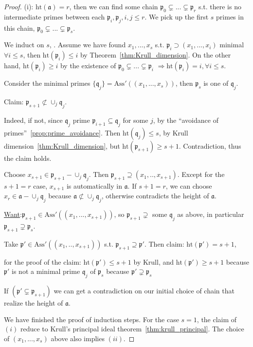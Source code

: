 \documentclass[11pt]{article}
\newcommand{\sca}{{\mathfrak a}}
\newcommand{\scp}{{\mathfrak p}}
\newcommand{\scq}{\mathfrak q}
\newcommand{\Lrta}{\Longrightarrow}
\begin{document}
\begin{proof}
(i): $\text{ht}(\sca)=r$, then we can find some chain $\scp_0\subsetneq ...\subsetneq\scp_r $ s.t. there is no intermediate primes between each $\scp_i,\scp_j,i,j\leq r$. We pick up the first $s$ primes in this chain, $\scp_0\subsetneq ...\subsetneq\scp_s$. 

We induct on $s$, . Assume we have found $x_1,...,x_s$ s.t.
$\scp_i\supset(x_1,...,x_i)$ minimal $\forall i\leq s$, then $\text{ht}(\scp_i)\leq i$ by Theorem~\ref{thm:Krull_dimension}. On the other hand, $\text{ht}(\scp_i)\geq i$ by the existence of $\scp_0\subsetneq...\subsetneq \scp_i$ $\Lrta\text{ht}(\scp_i)=i,\forall i\leq s$.

Consider the minimal primes $\{\scq_j\}=\text{Ass}'((x_1,...,x_s))$, then $\scp_s$ is one of $\scq_j$.

Claim: $\scp_{s+1}\not \subset \cup_j\scq_j$.

Indeed, if not, since $\scq_j$ prime $\scp_{i+1}\subseteq \scq_j$ for some $j$, by the ``avoidance of primes''~\ref{prop:prime_avoidance}. Then $\text{ht}(\scq_j)\leq s$, by Krull dimension~\ref{thm:Krull_dimension}, but $\text{ht}(\scp_{s+1})\geq s+1$. Contradiction, thus the claim holds.

Choose $x_{s+1}\in\scp_{s+1}-\cup_j\scq_j$. Then $\scp_{s+1}\supseteq(x_1,..,x_{s+1})$. Except for the $s+1=r$ case, $x_{s+1}$ is automatically in $\sca$. If $s+1=r$, we can choose $x_r\in \sca-\cup_j\scq_j$ because $\sca\not\subset\cup_j\scq_j$, otherwise contradicts the height of $\sca$.

\underline{Want}:$\scp_{s+1}\in \text{Ass}'((x_1,...,x_{s+1}))$, so $\scp_{s+1}\supsetneq $ some $\scq_j$ as above, in particular $\scp_{s+1}\supsetneq\scp_s$.

Take $\scp'\in \text{Ass}'((x_1,..,x_{s+1}))$ s.t. $\scp_{s+1}\supseteq\scp'.$ Then claim: $\text{ht}(\scp')=s+1$,

for the proof of the claim:
$\text{ht}(\scp')\leq s+1$ by Krull, and $\text{ht}(\scp')\geq s+1$ because $\scp'$ is not a minimal prime $\scq_j$ of $\scp_s$ because $\scp'\supsetneq \scp_s$

If $(\scp'\subsetneq \scp_{s+1})$ we can get a contradiction on our initial choice of chain that realize the height of $\sca$.

We have finished the proof of induction steps. For the case $s=1$, the claim of $(i)$ reduce to Krull's principal ideal theorem~\ref{thm:krull_principal}.  The choice of $(x_1,...,x_s)$ above also implies $(ii)$.
\end{proof}
\end{document}
